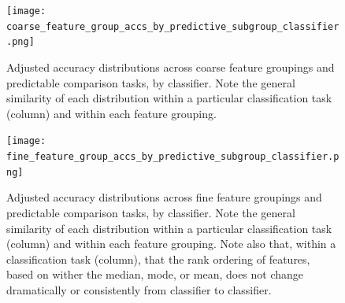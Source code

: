 \documentclass{article}  %
\begin{document}
\begin{figure}[H]
\begin{center}
\texttt{[image: coarse\_feature\_group\_accs\_by\_predictive\_subgroup\_classifier.png]}
\end{center}
\caption
{ \label{fig:coarse-classifier-acc} Adjusted accuracy distributions across
coarse feature groupings and predictable comparison tasks, by classifier. Note
the general similarity of each distribution within a particular classification
task (column) and within each feature grouping.}
\end{figure}



\begin{figure}[H]
\begin{center}
\texttt{[image: fine\_feature\_group\_accs\_by\_predictive\_subgroup\_classifier.png]}
\end{center}
\caption
{ \label{fig:fine-classifier-acc} Adjusted accuracy distributions across fine
feature groupings and predictable comparison tasks, by classifier. Note the
general similarity of each distribution within a particular classification task
(column) and within each feature grouping. Note also that, within a
classification task (column), that the rank ordering of features, based on
wither the median, mode, or mean, does not change dramatically or consistently
from classifier to classifier. }
\end{figure}
\end{document}
